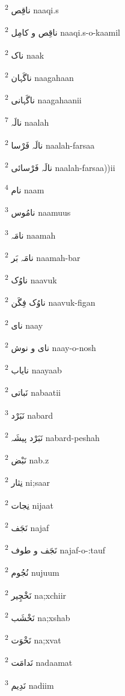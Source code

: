 \documentclass[12pt]{article}
\begin{document}
\begin{multicols}{5}
{\ur ناقِص}   \textsuperscript{2} naaqi.s

{\ur ناقِص و کامِل}   \textsuperscript{2} naaqi.s-o-kaamil

{\ur ناک}   \textsuperscript{2} naak

{\ur ناگَہان}   \textsuperscript{2} naagahaan

{\ur ناگَہانی}   \textsuperscript{2} naagahaanii

{\ur نالَہ}   \textsuperscript{7} naalah

{\ur نالَہ فَرْسا}   \textsuperscript{2} naalah-farsaa

{\ur نالَہ فَرْسائی}   \textsuperscript{2} naalah-farsaa))ii

{\ur نام}   \textsuperscript{4} naam

{\ur نامُوس}   \textsuperscript{3} naamuus

{\ur نامَہ}   \textsuperscript{3} naamah

{\ur نامَہ بَر}   \textsuperscript{2} naamah-bar

{\ur ناوُک}   \textsuperscript{2} naavuk

{\ur ناوُک فِگَن}   \textsuperscript{2} naavuk-figan

{\ur نای}   \textsuperscript{2} naay

{\ur نای و نوش}   \textsuperscript{2} naay-o-nosh

{\ur نایاب}   \textsuperscript{2} naayaab

{\ur نَباتی}   \textsuperscript{2} nabaatii

{\ur نَبَرْد}   \textsuperscript{3} nabard

{\ur نَبَرْد پیشَہ}   \textsuperscript{2} nabard-peshah

{\ur نَبْض}   \textsuperscript{2} nab.z

{\ur نِثار}   \textsuperscript{2} ni;saar

{\ur نِجات}   \textsuperscript{2} nijaat

{\ur نَجَف}   \textsuperscript{2} najaf

{\ur نَجَف و طوف}   \textsuperscript{2} najaf-o-:tauf

{\ur نُجُوم}   \textsuperscript{2} nujuum

{\ur نَخْچِیر}   \textsuperscript{2} na;xchiir

{\ur نَخْشَب}   \textsuperscript{2} na;xshab

{\ur نَخْوَت}   \textsuperscript{2} na;xvat

{\ur نَدامَت}   \textsuperscript{2} nadaamat

{\ur نَدِیم}   \textsuperscript{3} nadiim


\end{multicols}
\end{document}

